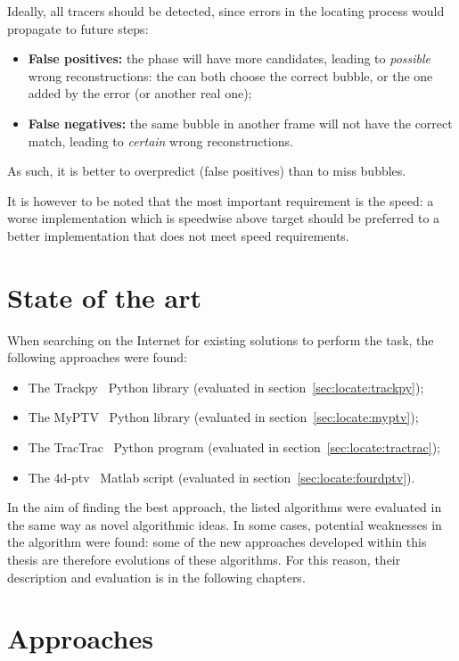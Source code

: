 Ideally, all tracers should be detected, since errors in the locating process would propagate to future steps:
\begin{itemize}
	\itemsep 0em
	\item \textbf{False positives:} the \match* phase will have more candidates, leading to \textit{possible} wrong reconstructions: the \match* can both choose the correct bubble, or the one added by the error (or another real one);
	\item \textbf{False negatives:} the same bubble in another frame will not have the correct match, leading to \textit{certain} wrong reconstructions.
\end{itemize}
As such, it is better to overpredict (false positives) than to miss bubbles.

It is however to be noted that the most important requirement is the speed: a worse implementation which is speedwise above target should be preferred to a better implementation that does not meet speed requirements.

\section{State of the art}

When searching on the Internet for existing solutions to perform the \locate* task, the following approaches were found:
\begin{itemize}
	\itemsep 0em
	\item The Trackpy~\cite{trackpy} Python library (evaluated in section~\ref{sec:locate:trackpy});
	\item The MyPTV~\cite{myptv} Python library (evaluated in section~\ref{sec:locate:myptv});
	\item The TracTrac~\cite{tractrac} Python program (evaluated in section~\ref{sec:locate:tractrac});
	\item The 4d-ptv~\cite{fourdptv} Matlab script (evaluated in section~\ref{sec:locate:fourdptv}).
\end{itemize}
In the aim of finding the best approach, the listed algorithms were evaluated in the same way as novel algorithmic ideas.
In some cases, potential weaknesses in the algorithm were found: some of the new approaches developed within this thesis are therefore evolutions of these algorithms.
For this reason, their description and evaluation is in the following chapters.

\section{Approaches}
\label{sec:locate:approaches}

